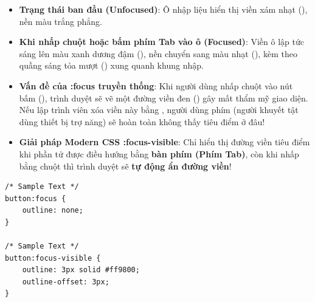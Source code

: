 \begin{browserWindow}
\begin{itemize}[leftmargin=1.5em, itemsep=3pt, parsep=0pt]
    \item \textbf{Trạng thái ban đầu (Unfocused)}: Ô nhập liệu hiển thị viền xám nhạt (), nền màu trắng phẳng.
    \item \textbf{Khi nhấp chuột hoặc bấm phím Tab vào ô (Focused)}: Viền ô lập tức sáng lên màu xanh dương đậm (), nền chuyển sang màu nhạt (), kèm theo quầng sáng tỏa mượt () xung quanh khung nhập.
\end{itemize}
\end{browserWindow}

\begin{conceptBox}
\begin{itemize}[leftmargin=1.5em, itemsep=3pt, parsep=0pt]
    \item \textbf{Vấn đề của :focus truyền thống}: Khi người dùng nhấp chuột vào nút bấm (), trình duyệt sẽ vẽ một đường viền đen () gây mất thẩm mỹ giao diện. Nếu lập trình viên xóa viền này bằng , người dùng phím  (người khuyết tật dùng thiết bị trợ năng) sẽ hoàn toàn không thấy tiêu điểm ở đâu!
    \item \textbf{Giải pháp Modern CSS :focus-visible}: Chỉ hiển thị đường viền tiêu điểm khi phần tử được điều hướng bằng \textbf{bàn phím (Phím Tab)}, còn khi nhấp bằng chuột thì trình duyệt sẽ \textbf{tự động ẩn đường viền}!
\end{itemize}

\begin{codeWindow}
\begin{lstlisting}[language=CSS3]
/* Sample Text */
button:focus {
    outline: none;
}

/* Sample Text */
button:focus-visible {
    outline: 3px solid #ff9800;
    outline-offset: 3px;
}
\end{lstlisting}
\end{codeWindow}
\end{conceptBox}

